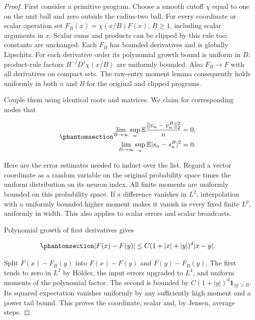 \documentclass[
  11pt,
]{article}
\theoremstyle{definition}
\theoremstyle{plain}
\theoremstyle{plain}
\theoremstyle{plain}
\theoremstyle{remark}
\begin{document}
\begin{proof}
First consider a primitive program. Choose a smooth cutoff \(\chi\)
equal to one on the unit ball and zero outside the radius-two ball. For
every coordinate or scalar operation set \(F_B(x)=\chi(x/B)F(x)\),
\(B\ge1\), including scalar arguments in \(x\). Scalar sums and products
can be clipped by this rule too; constants are unchanged. Each \(F_B\)
has bounded derivatives and is globally Lipschitz. For each derivative
order its polynomial growth bound is uniform in \(B\): product-rule
factors \(B^{-j}D^j\chi(x/B)\) are uniformly bounded. Also \(F_B\to F\)
with all derivatives on compact sets. The raw-entry moment lemma
consequently holds uniformly in both \(n\) and \(B\) for the original
and clipped programs.

Couple them using identical roots and matrices. We claim for
corresponding nodes that

\begin{equation}\protect\phantomsection\label{eq-mfp-clipping-errors}{
\begin{aligned}
\lim_{B\to\infty}\sup_n\mathbb E\frac{\|v_n-v_n^B\|_2^2}{n}&=0,\\
\lim_{B\to\infty}\sup_n\mathbb E|s_n-s_n^B|^2&=0.
\end{aligned}
}\end{equation}

Here are the error estimates needed to induct over the list. Regard a
vector coordinate as a random variable on the original probability space
times the uniform distribution on its neuron index. All finite moments
are uniformly bounded on this probability space. If a difference
vanishes in \(L^2\), interpolation with a uniformly bounded higher
moment makes it vanish in every fixed finite \(L^p\), uniformly in
width. This also applies to scalar errors and scalar broadcasts.

Polynomial growth of first derivatives gives

\begin{equation}\protect\phantomsection\label{eq-mfp-polynomial-difference}{
|F(x)-F(y)|\le C(1+|x|+|y|)^d|x-y|.
}\end{equation}

Split \(F(x)-F_B(y)\) into \(F(x)-F(y)\) and \(F(y)-F_B(y)\). The first
tends to zero in \(L^2\) by Hölder, the input errors upgraded to
\(L^4\), and uniform moments of the polynomial factor. The second is
bounded by \(C(1+|y|)^d\mathbf1_{|y|>B}\). Its squared expectation
vanishes uniformly by any sufficiently high moment and a power tail
bound. This proves the coordinate, scalar and, by Jensen, average steps.


\end{proof}
\end{document}
